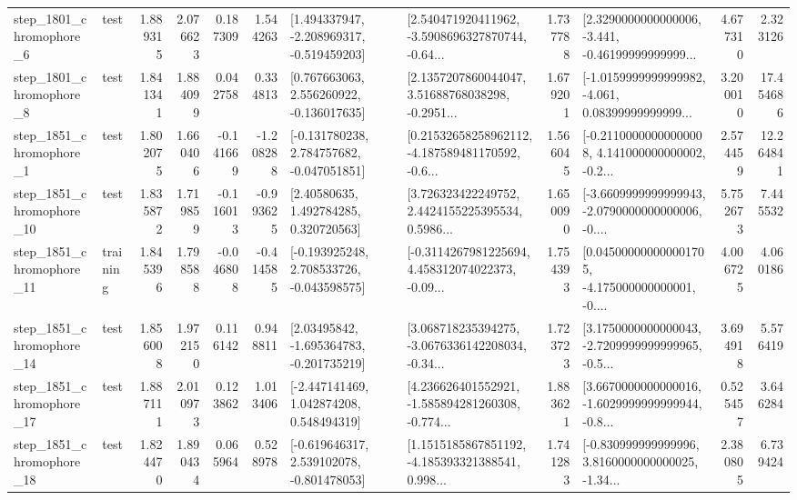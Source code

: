 \begin{tabular}{llrrrrllrlrr}
  step\_1801\_chromophore\_6 &      test &      1.889315 &    2.076623 &      0.187309 &  1.544263 &   [1.494337947, -2.208969317, -0.519459203] &  [2.540471920411962, -3.5908696327870744, -0.64... &       1.737788 &  [2.3290000000000006, -3.441, -0.46199999999999... &            4.677310 &          2.323126 \\
  step\_1801\_chromophore\_8 &      test &      1.841341 &    1.884099 &      0.042758 &  0.334813 &    [0.767663063, 2.556260922, -0.136017635] &  [2.1357207860044047, 3.51688768038298, -0.2951... &       1.679201 &  [-1.0159999999999982, -4.061, 0.08399999999999... &            3.200010 &         17.454686 \\
  step\_1851\_chromophore\_1 &      test &      1.802075 &    1.660406 &     -0.141669 & -1.208288 &   [-0.131780238, 2.784757682, -0.047051851] &  [0.21532658258962112, -4.187589481170592, -0.6... &       1.566045 &  [-0.21100000000000008, 4.141000000000002, -0.2... &            2.574459 &         12.264841 \\
 step\_1851\_chromophore\_10 &      test &      1.835872 &    1.719859 &     -0.116013 & -0.993625 &      [2.40580635, 1.492784285, 0.320720563] &  [3.726323422249752, 2.4424155225395534, 0.5986... &       1.650090 &  [-3.6609999999999943, -2.0790000000000006, -0.... &            5.752673 &          7.445532 \\
 step\_1851\_chromophore\_11 &  training &      1.845396 &    1.798588 &     -0.046808 & -0.414585 &   [-0.193925248, 2.708533726, -0.043598575] &  [-0.3114267981225694, 4.458312074022373, -0.09... &       1.754393 &  [0.045000000000001705, -4.175000000000001, -0.... &            4.006725 &          4.060186 \\
 step\_1851\_chromophore\_14 &      test &      1.856008 &    1.972150 &      0.116142 &  0.948811 &    [2.03495842, -1.695364783, -0.201735219] &  [3.068718235394275, -3.0676336142208034, -0.34... &       1.723723 &  [3.1750000000000043, -2.7209999999999965, -0.5... &            3.694918 &          5.576419 \\
 step\_1851\_chromophore\_17 &      test &      1.887111 &    2.010973 &      0.123862 &  1.013406 &    [-2.447141469, 1.042874208, 0.548494319] &  [4.236626401552921, -1.585894281260308, -0.774... &       1.883621 &  [3.6670000000000016, -1.6029999999999944, -0.8... &            0.525457 &          3.646284 \\
 step\_1851\_chromophore\_18 &      test &      1.824470 &    1.890434 &      0.065964 &  0.528978 &   [-0.619646317, 2.539102078, -0.801478053] &  [1.1515185867851192, -4.185393321388541, 0.998... &       1.741283 &  [-0.830999999999996, 3.8160000000000025, -1.34... &            2.380805 &          6.739424 \\

\end{tabular}
